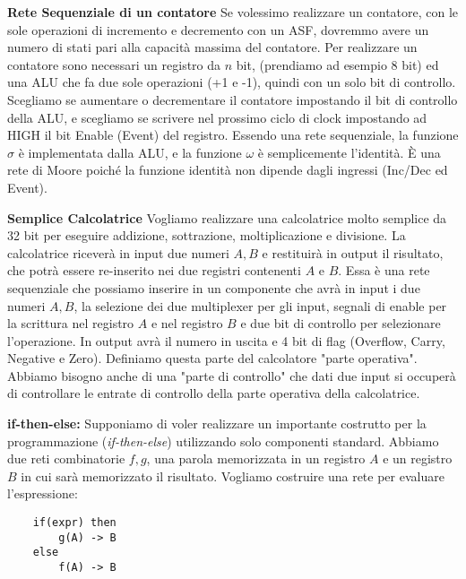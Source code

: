 \begin{exmp}
	\textbf{Rete Sequenziale di un contatore}
	Se volessimo realizzare un contatore, con le sole operazioni di incremento e decremento con un ASF, dovremmo avere un numero di stati pari alla capacità massima del contatore.
	Per realizzare un contatore sono necessari un registro da $ n $ bit, (prendiamo ad esempio 8 bit) ed una ALU che fa due sole operazioni (+1 e -1), quindi con un solo bit di controllo. Scegliamo se aumentare o decrementare il contatore impostando il bit di controllo della ALU, e scegliamo se scrivere nel prossimo ciclo di clock impostando ad HIGH il bit Enable (Event) del registro. Essendo una rete sequenziale, la funzione $ \sigma $ è implementata dalla ALU, e la funzione $ \omega $ è semplicemente l'identità. È una rete di Moore poiché la funzione identità non dipende dagli ingressi (Inc/Dec ed Event).
	
\end{exmp}


\begin{exmp}
	\textbf{Semplice Calcolatrice}
	Vogliamo realizzare una calcolatrice molto semplice da 32 bit per eseguire addizione, sottrazione, moltiplicazione e divisione. La calcolatrice riceverà in input due numeri $ A,B $ e restituirà in output il risultato, che potrà essere re-inserito nei due registri contenenti $ A $ e $ B $. Essa è una rete sequenziale che possiamo inserire in un componente che avrà in input i due numeri $ A,B $, la selezione dei due multiplexer per gli input, segnali di enable per la scrittura nel registro $ A $ e nel registro $ B $ e due bit di controllo per selezionare l'operazione. In output avrà il numero in uscita e 4 bit di flag (Overflow, Carry, Negative e Zero). Definiamo questa parte del calcolatore "parte operativa". Abbiamo bisogno anche di una "parte di controllo" che dati due input si occuperà di controllare le entrate di controllo della parte operativa della calcolatrice.
	
\end{exmp}


\begin{defn}
	\textbf{if-then-else:}
	Supponiamo di voler realizzare un importante costrutto per la programmazione (\textit{if-then-else}) utilizzando solo componenti standard. Abbiamo due reti combinatorie $ f,g $, una parola memorizzata in un registro $ A $ e un registro $ B $ in cui sarà memorizzato il risultato. Vogliamo costruire una rete per evaluare l'espressione:
	
	\begin{Verbatim}
	if(expr) then
		g(A) -> B
	else
		f(A) -> B
	\end{Verbatim}
	
\end{defn}

